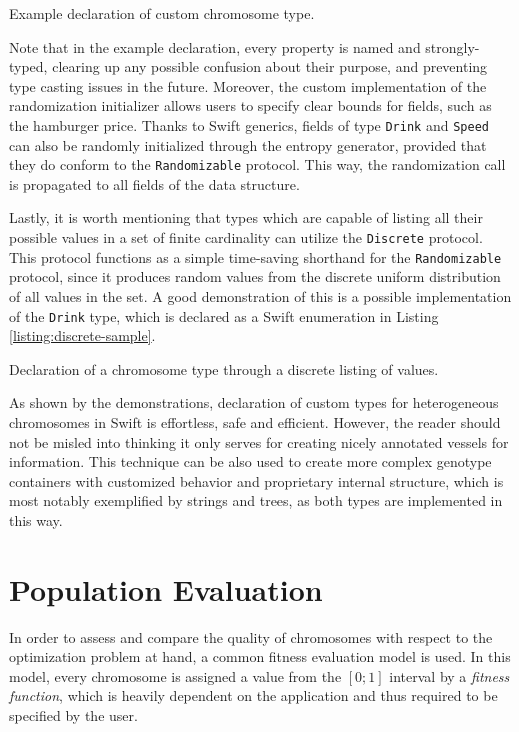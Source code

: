 \begin{listing}[ht]
	\caption{Example declaration of custom chromosome type.}
	\label{listing:hamburger-sample}
\end{listing}

Note that in the example declaration, every property is named and strongly-typed, clearing up any possible confusion about their purpose, and preventing type casting issues in the future. Moreover, the custom implementation of the randomization initializer allows users to specify clear bounds for fields, such as the hamburger price. Thanks to Swift generics, fields of type \texttt{Drink} and \texttt{Speed} can also be randomly initialized through the entropy generator, provided that they do conform to the \texttt{Randomizable} protocol. This way, the randomization call is propagated to all fields of the data structure.

Lastly, it is worth mentioning that types which are capable of listing all their possible values in a set of finite cardinality can utilize the \texttt{Discrete} protocol. This protocol functions as a simple time-saving shorthand for the \texttt{Randomizable} protocol, since it produces random values from the discrete uniform distribution of all values in the set. A good demonstration of this is a possible implementation of the \texttt{Drink} type, which is declared as a Swift enumeration in Listing \ref{listing:discrete-sample}.

\begin{listing}[ht]
	\caption{Declaration of a chromosome type through a discrete listing of values.}
	\label{listing:discrete-sample}
\end{listing}

As shown by the demonstrations, declaration of custom types for heterogeneous chromosomes in Swift is effortless, safe and efficient. However, the reader should not be misled into thinking it only serves for creating nicely annotated vessels for information. This technique can be also used to create more complex genotype containers with customized behavior and proprietary internal structure, which is most notably exemplified by strings and trees, as both types are implemented in this way.

\section{Population Evaluation}
In order to assess and compare the quality of chromosomes with respect to the optimization problem at hand, a common fitness evaluation model is used. In this model, every chromosome is assigned a value from the $[0;1]$ interval by a \textit{fitness function}, which is heavily dependent on the application and thus required to be specified by the user.

